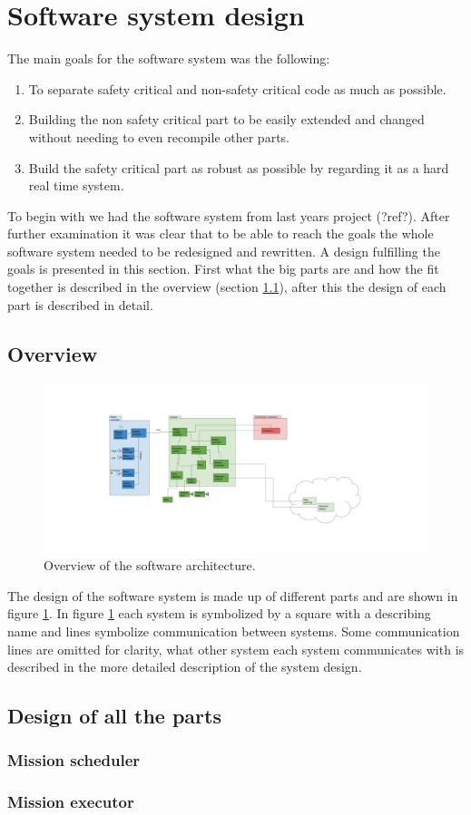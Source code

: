 \documentclass[main.tex]{subfiles}
\begin{document}
\section{Software system design}

The main goals for the software system was the following:
\begin{enumerate}
    \item To separate safety critical and non-safety critical code as much as possible.
    \item Building the non safety critical part to be easily extended and changed without needing to even recompile other parts.
    \item Build the safety critical part as robust as possible by regarding it as a hard real time system.
\end{enumerate}


To begin with we had the software system from last years project (?ref?).
After further examination it was clear that to be able to reach the goals the whole software system
needed to be redesigned and rewritten. A design fulfilling the goals is presented in this section.
First what the big parts are and how the fit together is described in the overview (section \ref{sec:sw_design_overview}),
after this the design of each part is described in detail.

\subsection{Overview}
\label{sec:sw_design_overview}

\begin{figure}
    \includegraphics[width=\textwidth]{software_overview.png}
    \caption{Overview of the software architecture.}
    \label{fig:software_overview}
\end{figure}

The design of the software system is made up of different parts and are shown in figure \ref{fig:software_overview}. 
In figure \ref{fig:software_overview} each system is symbolized by a square with a describing name and
lines symbolize communication between systems. Some communication lines are omitted for clarity,
what other system each system communicates with is described in the more detailed description of the system design.


\subsection{Design of all the parts}

\subsubsection{Mission scheduler}

\subsubsection{Mission executor}
\end{document}
